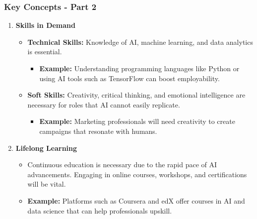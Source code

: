 \documentclass[aspectratio=169]{beamer}
\begin{document}
\begin{frame}[fragile]
    \frametitle{Key Concepts - Part 2}
    \begin{enumerate}[resume]
        \item \textbf{Skills in Demand}
            \begin{itemize}
                \item \textbf{Technical Skills:} Knowledge of AI, machine learning, and data analytics is essential.
                    \begin{itemize}
                        \item \textbf{Example:} Understanding programming languages like Python or using AI tools such as TensorFlow can boost employability.
                    \end{itemize}
                \item \textbf{Soft Skills:} Creativity, critical thinking, and emotional intelligence are necessary for roles that AI cannot easily replicate.
                    \begin{itemize}
                        \item \textbf{Example:} Marketing professionals will need creativity to create campaigns that resonate with humans.
                    \end{itemize}
            \end{itemize}

        \item \textbf{Lifelong Learning}
            \begin{itemize}
                \item Continuous education is necessary due to the rapid pace of AI advancements. Engaging in online courses, workshops, and certifications will be vital.
                \item \textbf{Example:} Platforms such as Coursera and edX offer courses in AI and data science that can help professionals upskill.
            \end{itemize}
    \end{enumerate}
\end{frame}
\end{document}
